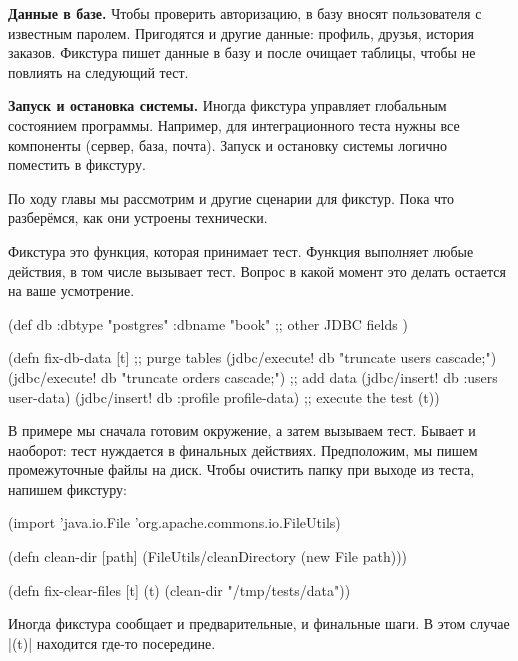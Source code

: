 \textbf{Данные в базе.} Чтобы проверить авторизацию, в базу вносят пользователя
с известным паролем. Пригодятся и другие данные: профиль, друзья, история
заказов. Фикстура пишет данные в базу и после очищает таблицы, чтобы не повлиять
на следующий тест.

\textbf{Запуск и остановка системы.} Иногда фикстура управляет глобальным
состоянием программы. Например, для интеграционного теста нужны все компоненты
(сервер, база, почта). Запуск и остановку системы логично поместить в фикстуру.

По ходу главы мы рассмотрим и другие сценарии для фикстур. Пока что разбер\"{е}мся,
как они устроены технически.

Фикстура это функция, которая принимает тест. Функция выполняет любые действия,
в том числе вызывает тест. Вопрос в какой момент это делать остается на ваше
усмотрение.


\begin{english}
  \begin{clojure}
(def db {:dbtype "postgres" :dbname "book"
         ;; other JDBC fields
         })

(defn fix-db-data [t]
  ;; purge tables
  (jdbc/execute! db "truncate users cascade;")
  (jdbc/execute! db "truncate orders cascade;")
  ;; add data
  (jdbc/insert! db :users user-data)
  (jdbc/insert! db :profile profile-data)
  ;; execute the test
  (t))
  \end{clojure}
\end{english}

В примере мы сначала готовим окружение, а затем вызываем тест. Бывает и
наоборот: тест нуждается в финальных действиях. Предположим, мы пишем
промежуточные файлы на диск. Чтобы очистить папку при выходе из теста, напишем
фикстуру:


\begin{english}
  \begin{clojure}
(import 'java.io.File
        'org.apache.commons.io.FileUtils)

(defn clean-dir [path]
  (FileUtils/cleanDirectory (new File path)))

(defn fix-clear-files [t]
  (t)
  (clean-dir "/tmp/tests/data"))
  \end{clojure}
\end{english}

Иногда фикстура сообщает и предварительные, и финальные шаги. В этом случае
\spverb|(t)| находится где-то посередине.

